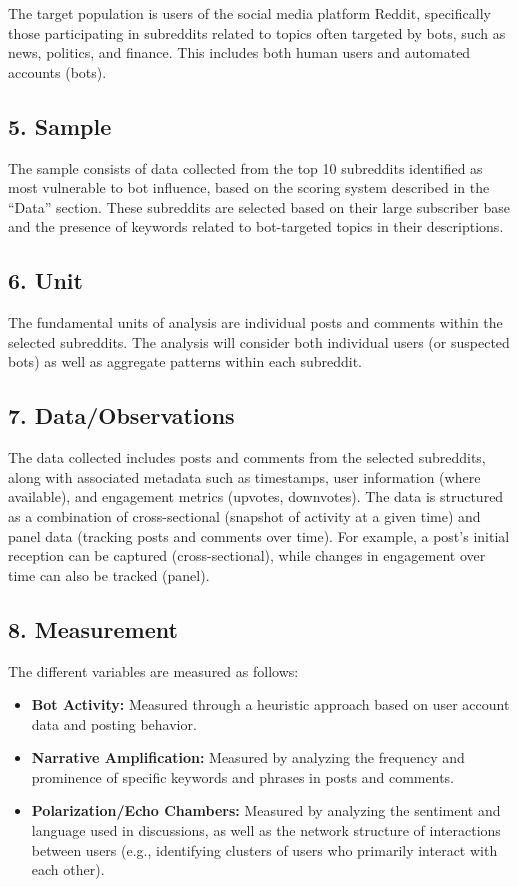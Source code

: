 \documentclass[
  letterpaper,
  DIV=11,
  numbers=noendperiod]{scrartcl}
\providecommand{\tightlist}{%
  \setlength{\itemsep}{0pt}\setlength{\parskip}{0pt}}\usepackage{longtable,booktabs,array}
\begin{document}
The target population is users of the social media platform Reddit,
specifically those participating in subreddits related to topics often
targeted by bots, such as news, politics, and finance. This includes
both human users and automated accounts (bots).

\subsection{5. Sample}\label{sample}

The sample consists of data collected from the top 10 subreddits
identified as most vulnerable to bot influence, based on the scoring
system described in the ``Data'' section. These subreddits are selected
based on their large subscriber base and the presence of keywords
related to bot-targeted topics in their descriptions.

\subsection{6. Unit}\label{unit}

The fundamental units of analysis are individual posts and comments
within the selected subreddits. The analysis will consider both
individual users (or suspected bots) as well as aggregate patterns
within each subreddit.

\subsection{7. Data/Observations}\label{dataobservations}

The data collected includes posts and comments from the selected
subreddits, along with associated metadata such as timestamps, user
information (where available), and engagement metrics (upvotes,
downvotes). The data is structured as a combination of cross-sectional
(snapshot of activity at a given time) and panel data (tracking posts
and comments over time). For example, a post's initial reception can be
captured (cross-sectional), while changes in engagement over time can
also be tracked (panel).

\subsection{8. Measurement}\label{measurement-1}

The different variables are measured as follows:

\begin{itemize}
\tightlist
\item
  \textbf{Bot Activity:} Measured through a heuristic approach based on
  user account data and posting behavior.
\item
  \textbf{Narrative Amplification:} Measured by analyzing the frequency
  and prominence of specific keywords and phrases in posts and comments.
\item
  \textbf{Polarization/Echo Chambers:} Measured by analyzing the
  sentiment and language used in discussions, as well as the network
  structure of interactions between users (e.g., identifying clusters of
  users who primarily interact with each other).
\end{itemize}
\end{document}
